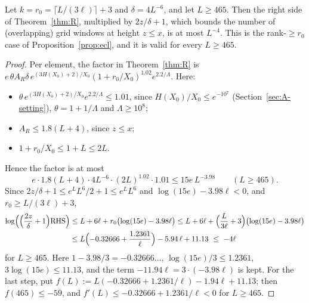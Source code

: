 \begin{corollary}\label{cor:R-Ecl}
Let $k=r_0=\lceil L/(3\ell)\rceil+3$ and $\delta=4L^{-6}$, and let $L\ge465$. Then the right side of
Theorem~\ref{thm:R}, multiplied by $2z/\delta+1$, which bounds the number of (overlapping) grid windows at height
$z\le x$, is at most $L^{-4}$. This is the
rank-$\ge r_0$ case of Proposition~\ref{prop:ecl}, and it is valid for every $L\ge465$.
\end{corollary}

\begin{proof}
Per element, the factor in Theorem~\ref{thm:R} is
$e\,\theta A_R\delta\,e^{(3H(X_0)+2)/X_0}(1+r_0/X_0)^{1.02}e^{2.2/\Lambda}$. Here:
\begin{itemize}
\item $\theta\,e^{(3H(X_0)+2)/X_0}e^{2.2/\Lambda}\le1.01$, since $H(X_0)/X_0\le e^{-10^{7}}$ (Section~\ref{sec:A-setting}),
  $\theta=1+1/\Lambda$ and $\Lambda\ge10^{8}$;
\item $A_R\le1.8(L+4)$, since $z\le x$;
\item $1+r_0/X_0\le1+L\le2L$.
\end{itemize}
Hence the factor is at most
\[
  e\cdot1.8(L+4)\cdot4L^{-6}\cdot(2L)^{1.02}\cdot1.01\le15e\,L^{-3.98}\qquad(L\ge465).
\]
Since $2z/\delta+1\le e^{L}L^{6}/2+1\le e^LL^6$ and $\log(15e)-3.98\ell<0$, and $r_0\ge L/(3\ell)+3$,
\[
\begin{aligned}
  \log\Bigl(\Bigl(\frac{2z}\delta+1\Bigr)\mathrm{RHS}\Bigr)&\le L+6\ell+r_0\bigl(\log(15e)-3.98\ell\bigr)
  \le L+6\ell+\Bigl(\frac L{3\ell}+3\Bigr)\bigl(\log(15e)-3.98\ell\bigr)\\
  &\le L\Bigl(-0.32666+\frac{1.2361}{\ell}\Bigr)-5.94\,\ell+11.13\ \le\ -4\ell
\end{aligned}
\]
for $L\ge465$. Here $1-3.98/3=-0.32666\ldots$, $\log(15e)/3\le1.2361$, $3\log(15e)\le11.13$, and the term
$-11.94\ell=3\cdot(-3.98\ell)$ is kept. For the last step, put $f(L):=L(-0.32666+1.2361/\ell)-1.94\ell+11.13$; then
$f(465)\le-59$, and $f'(L)\le-0.32666+1.2361/\ell<0$ for $L\ge465$.
\end{proof}
